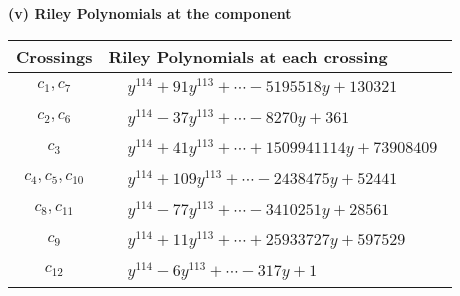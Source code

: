 \documentclass[1p]{elsarticle_modified}
\theoremstyle{definition}
\begin{document}
\flushleft \textbf{(v) Riley Polynomials at the component}\newline \\
\begin{tabular}{m{50pt}|m{274pt}}
Crossings & \hspace{64pt}Riley Polynomials at each crossing \\
\hline $$\begin{aligned}c_{1},c_{7}\end{aligned}$$&$\begin{aligned}
&y^{114}+91 y^{113}+\cdots-5195518 y+130321
\end{aligned}$\\
\hline $$\begin{aligned}c_{2},c_{6}\end{aligned}$$&$\begin{aligned}
&y^{114}-37 y^{113}+\cdots-8270 y+361
\end{aligned}$\\
\hline $$\begin{aligned}c_{3}\end{aligned}$$&$\begin{aligned}
&y^{114}+41 y^{113}+\cdots+1509941114 y+73908409
\end{aligned}$\\
\hline $$\begin{aligned}c_{4},c_{5},c_{10}\end{aligned}$$&$\begin{aligned}
&y^{114}+109 y^{113}+\cdots-2438475 y+52441
\end{aligned}$\\
\hline $$\begin{aligned}c_{8},c_{11}\end{aligned}$$&$\begin{aligned}
&y^{114}-77 y^{113}+\cdots-3410251 y+28561
\end{aligned}$\\
\hline $$\begin{aligned}c_{9}\end{aligned}$$&$\begin{aligned}
&y^{114}+11 y^{113}+\cdots+25933727 y+597529
\end{aligned}$\\
\hline $$\begin{aligned}c_{12}\end{aligned}$$&$\begin{aligned}
&y^{114}-6 y^{113}+\cdots-317 y+1
\end{aligned}$\\
\hline
\end{tabular}\\~\\
\end{document}
